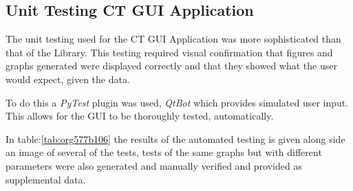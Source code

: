 \documentclass[11pt]{report}
\begin{document}
\clearpage

\subsection{Unit Testing CT GUI Application}
\label{sec:org8750898}

The unit testing used for the CT GUI Application was more sophisticated than that of the Library. This testing required visual confirmation that figures and graphs generated were displayed correctly and that they showed what the user would expect, given the data.

To do this a \emph{PyTest} plugin was used, \emph{QtBot} which provides simulated user input. This allows for the GUI to be thoroughly tested, automatically.

In table:\ref{tab:org577b106} the results of the automated testing is given along side an image of several of the tests, tests of the same graphs but with different parameters were also generated and manually verified and provided as supplemental data.
\end{document}
